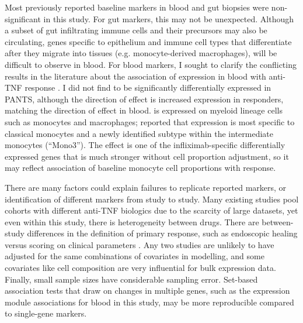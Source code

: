 Most previously reported baseline markers in blood and gut biopsies were non-significant in this study.
For gut markers, this may not be unexpected.
Although a subset of gut infiltrating immune cells and their precursors may also be circulating,
genes specific to epithelium and immune cell types that differentiate after they migrate into tissues (e.g. monocyte-derived macrophages),
will be difficult to observe in blood.
For blood markers, I sought to clarify the conflicting results in the literature about the association of  expression in blood with anti-\gls{TNF} response \autocite{gaujoux2019CellcentredMetaanalysisReveals,verstockt2019LowTREM1Expression}.
I did not find  to be significantly differentially expressed in \gls{PANTS},
although the direction of effect is increased expression in responders,
matching the \textcite{gaujoux2019CellcentredMetaanalysisReveals} direction of effect in blood.
 is expressed on myeloid lineage cells such as monocytes and macrophages;
\textcite{villani2017SinglecellRNAseqReveals} reported that  expression is most specific to 
classical monocytes and a newly identified subtype within the intermediate monocytes (\enquote{Mono3}).
The  effect is one of the infliximab-specific differentially expressed genes that is much stronger without cell proportion adjustment,
so it may reflect association of baseline monocyte cell proportions with response.

There are many factors could explain failures to replicate reported markers, or identification of different markers from study to study.
Many existing studies pool cohorts with different anti-\gls{TNF} biologics due to the scarcity of large datasets,
yet even within this study, there is heterogeneity between drugs.
There are between-study differences in the definition of primary response,
such as endoscopic healing \autocite{gaujoux2019CellcentredMetaanalysisReveals} versus scoring on clinical parameters \autocite{verstockt2019LowTREM1Expression}.
Any two studies are unlikely to have adjusted for the same combinations of covariates in modelling,
and some covariates like cell composition are very influential for bulk expression data.
Finally, small sample sizes have considerable sampling error.
Set-based association tests that draw on changes in multiple genes,
such as the expression module associations for blood in this study,
may be more reproducible compared to single-gene markers. 

